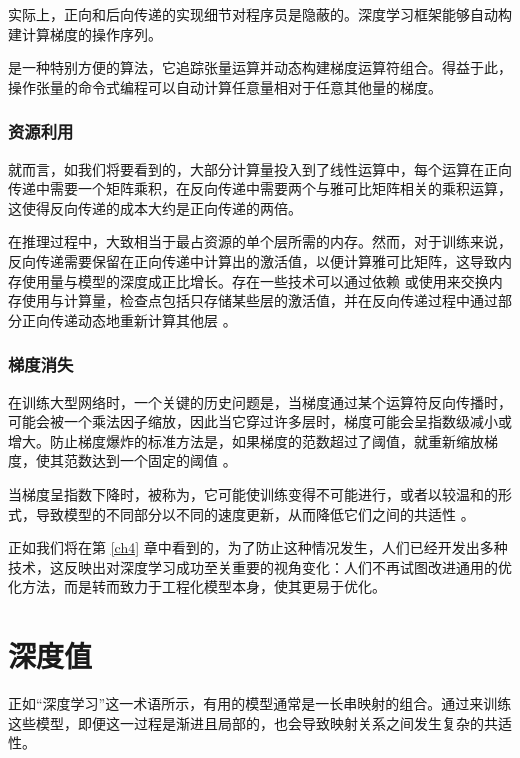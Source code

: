 实际上，正向和后向传递的实现细节对程序员是隐蔽的。深度学习框架能够自动构建计算梯度的操作序列。

 \citep{arxiv-1502.05767} 是一种特别方便的算法，它追踪张量运算并动态构建梯度运算符组合。得益于此，操作张量的命令式编程可以自动计算任意量相对于任意其他量的梯度。

\subsubsection*{资源利用}

就而言，如我们将要看到的，大部分计算量投入到了线性运算中，每个运算在正向传递中需要一个矩阵乘积，在反向传递中需要两个与雅可比矩阵相关的乘积运算，这使得反向传递的成本大约是正向传递的两倍。

在推理过程中，大致相当于最占资源的单个层所需的内存。然而，对于训练来说，反向传递需要保留在正向传递中计算出的激活值，以便计算雅可比矩阵，这导致内存使用量与模型的深度成正比增长。存在一些技术可以通过依赖 \citep{arxiv-1707.04585} 或使用来交换内存使用与计算量，检查点包括只存储某些层的激活值，并在反向传递过程中通过部分正向传递动态地重新计算其他层 \citep{arxiv-1604.06174}。

\subsubsection*{梯度消失}

在训练大型网络时，一个关键的历史问题是，当梯度通过某个运算符反向传播时，可能会被一个乘法因子缩放，因此当它穿过许多层时，梯度可能会呈指数级减小或增大。防止梯度爆炸的标准方法是，如果梯度的范数超过了阈值，就重新缩放梯度，使其范数达到一个固定的阈值 \citep{pascanu13}。

当梯度呈指数下降时，被称为，它可能使训练变得不可能进行，或者以较温和的形式，导致模型的不同部分以不同的速度更新，从而降低它们之间的共适性 \citep{glorot10a}。

正如我们将在第 \ref{ch4} 章中看到的，为了防止这种情况发生，人们已经开发出多种技术，这反映出对深度学习成功至关重要的视角变化：人们不再试图改进通用的优化方法，而是转而致力于工程化模型本身，使其更易于优化。

\section{深度值}\label{sec3.6}

正如``深度学习''这一术语所示，有用的模型通常是一长串映射的组合。通过来训练这些模型，即便这一过程是渐进且局部的，也会导致映射关系之间发生复杂的共适性。

